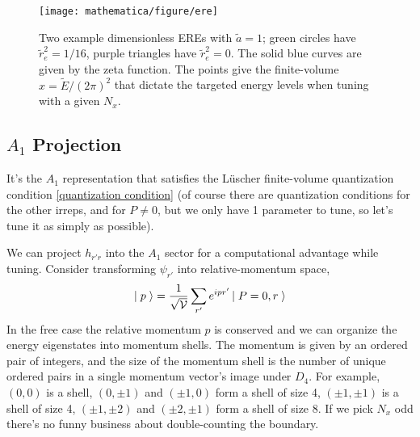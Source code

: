 \begin{figure}
	\texttt{[image: mathematica/figure/ere]}
	\caption{
		Two example dimensionless EREs with $\tilde{a}=1$; green circles have $\tilde{r}_e^2=1/16$, purple triangles have $\tilde{r}_e^2=0$.
		The solid blue curves are given by the zeta function.
		The points give the finite-volume $x = \tilde{E} / (2\pi)^2$ that dictate the targeted energy levels when tuning with a given $N_x$.
	}
	\label{fig:ere tuning}
\end{figure}

\subsection{$A_1$ Projection}

It's the $A_1$ representation that satisfies the L\"{u}scher finite-volume quantization condition \eqref{quantization condition} (of course there are quantization conditions for the other irreps, and for $P\neq 0$, but we only have 1 parameter to tune, so let's tune it as simply as possible).

We can project $h_{r'r}$ into the $A_1$ sector for a computational advantage while tuning.
Consider transforming $\psi_{r'}$ into relative-momentum space,
\begin{align}
    \left|\;p\;\right\rangle = \frac{1}{\sqrt{\mathcal{V}}}\sum_{r'} e^{ipr'} \left|\;P=0, r\;\right\rangle
\end{align}
In the free case the relative momentum $p$ is conserved and we can organize the energy eigenstates into momentum shells.
The momentum is given by an ordered pair of integers, and the size of the momentum shell is the number of unique ordered pairs in a single momentum vector's image under $D_4$.
For example, $(0,0)$ is a shell, $(0,\pm 1)$ and $(\pm 1, 0)$ form a shell of size 4, $(\pm 1, \pm 1)$ is a shell of size 4, $(\pm 1, \pm 2)$ and $(\pm 2, \pm 1)$ form a shell of size 8.
If we pick $N_x$ odd there's no funny business about double-counting the boundary.

